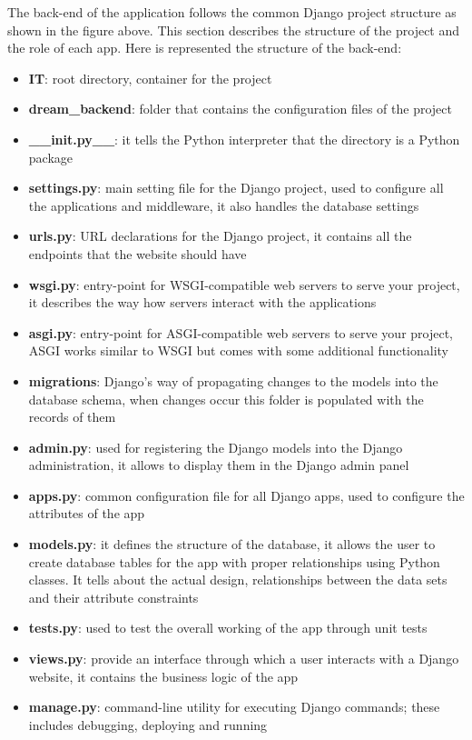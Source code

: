 \documentclass[table, 12pt]{article}
\begin{document}
The back-end of the application follows the common Django project structure as shown in the figure above.
This section describes the structure of the project and the role of each app.\newline
Here is represented the structure of the back-end:

\begin{itemize}
    \item \textbf{IT}: root directory, container for the project
    \item \textbf{dream\_backend}: folder that contains the configuration files of the project
    \item \textbf{\_\_init.py\_\_}: it tells the Python interpreter that the directory is a Python package
    \item \textbf{settings.py}: main setting file for the Django project, used to configure all the applications and middleware, it also handles the database settings
    \item \textbf{urls.py}: URL declarations for the Django project, it contains all the endpoints that the website should have
    \item \textbf{wsgi.py}: entry-point for WSGI-compatible web servers to serve your project, it describes the way how servers interact with the applications
    \item \textbf{asgi.py}: entry-point for ASGI-compatible web servers to serve your project, ASGI works similar to WSGI but comes with some additional functionality
    \item \textbf{migrations}: Django's way of propagating changes to the models into the database schema, when changes occur this folder is populated with the records of them
    \item \textbf{admin.py}: used for registering the Django models into the Django administration, it allows to display them in the Django admin panel
    \item \textbf{apps.py}: common configuration file for all Django apps, used to configure the attributes of the app
    \item \textbf{models.py}: it defines the structure of the database, it allows the user to create database tables for the app with proper relationships using Python classes. It tells about the actual design, relationships between the data sets and their attribute constraints
    \item \textbf{tests.py}: used to test the overall working of the app through unit tests
    \item \textbf{views.py}: provide an interface through which a user interacts with a Django website, it contains the business logic of the app
    \item \textbf{manage.py}: command-line utility for executing Django commands; these includes debugging, deploying and running
\end{itemize}
\end{document}
